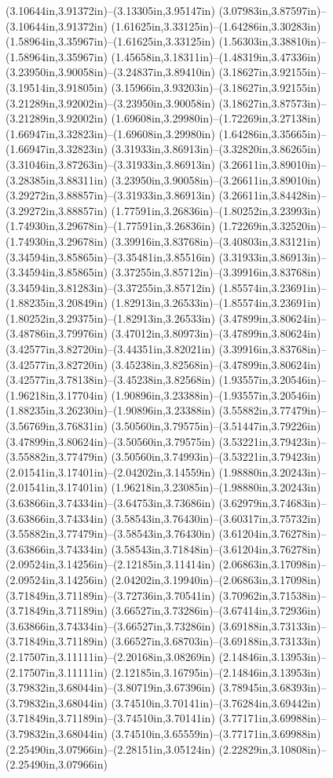 (3.10644in,3.91372in)--(3.13305in,3.95147in) (3.07983in,3.87597in)--(3.10644in,3.91372in) (1.61625in,3.33125in)--(1.64286in,3.30283in) (1.58964in,3.35967in)--(1.61625in,3.33125in) (1.56303in,3.38810in)--(1.58964in,3.35967in) (1.45658in,3.18311in)--(1.48319in,3.47336in) (3.23950in,3.90058in)--(3.24837in,3.89410in) (3.18627in,3.92155in)--(3.19514in,3.91805in) (3.15966in,3.93203in)--(3.18627in,3.92155in) (3.21289in,3.92002in)--(3.23950in,3.90058in) (3.18627in,3.87573in)--(3.21289in,3.92002in) (1.69608in,3.29980in)--(1.72269in,3.27138in) (1.66947in,3.32823in)--(1.69608in,3.29980in) (1.64286in,3.35665in)--(1.66947in,3.32823in) (3.31933in,3.86913in)--(3.32820in,3.86265in) (3.31046in,3.87263in)--(3.31933in,3.86913in) (3.26611in,3.89010in)--(3.28385in,3.88311in) (3.23950in,3.90058in)--(3.26611in,3.89010in) (3.29272in,3.88857in)--(3.31933in,3.86913in) (3.26611in,3.84428in)--(3.29272in,3.88857in) (1.77591in,3.26836in)--(1.80252in,3.23993in) (1.74930in,3.29678in)--(1.77591in,3.26836in) (1.72269in,3.32520in)--(1.74930in,3.29678in) (3.39916in,3.83768in)--(3.40803in,3.83121in) (3.34594in,3.85865in)--(3.35481in,3.85516in) (3.31933in,3.86913in)--(3.34594in,3.85865in) (3.37255in,3.85712in)--(3.39916in,3.83768in) (3.34594in,3.81283in)--(3.37255in,3.85712in) (1.85574in,3.23691in)--(1.88235in,3.20849in) (1.82913in,3.26533in)--(1.85574in,3.23691in) (1.80252in,3.29375in)--(1.82913in,3.26533in) (3.47899in,3.80624in)--(3.48786in,3.79976in) (3.47012in,3.80973in)--(3.47899in,3.80624in) (3.42577in,3.82720in)--(3.44351in,3.82021in) (3.39916in,3.83768in)--(3.42577in,3.82720in) (3.45238in,3.82568in)--(3.47899in,3.80624in) (3.42577in,3.78138in)--(3.45238in,3.82568in) (1.93557in,3.20546in)--(1.96218in,3.17704in) (1.90896in,3.23388in)--(1.93557in,3.20546in) (1.88235in,3.26230in)--(1.90896in,3.23388in) (3.55882in,3.77479in)--(3.56769in,3.76831in) (3.50560in,3.79575in)--(3.51447in,3.79226in) (3.47899in,3.80624in)--(3.50560in,3.79575in) (3.53221in,3.79423in)--(3.55882in,3.77479in) (3.50560in,3.74993in)--(3.53221in,3.79423in) (2.01541in,3.17401in)--(2.04202in,3.14559in) (1.98880in,3.20243in)--(2.01541in,3.17401in) (1.96218in,3.23085in)--(1.98880in,3.20243in) (3.63866in,3.74334in)--(3.64753in,3.73686in) (3.62979in,3.74683in)--(3.63866in,3.74334in) (3.58543in,3.76430in)--(3.60317in,3.75732in) (3.55882in,3.77479in)--(3.58543in,3.76430in) (3.61204in,3.76278in)--(3.63866in,3.74334in) (3.58543in,3.71848in)--(3.61204in,3.76278in) (2.09524in,3.14256in)--(2.12185in,3.11414in) (2.06863in,3.17098in)--(2.09524in,3.14256in) (2.04202in,3.19940in)--(2.06863in,3.17098in) (3.71849in,3.71189in)--(3.72736in,3.70541in) (3.70962in,3.71538in)--(3.71849in,3.71189in) (3.66527in,3.73286in)--(3.67414in,3.72936in) (3.63866in,3.74334in)--(3.66527in,3.73286in) (3.69188in,3.73133in)--(3.71849in,3.71189in) (3.66527in,3.68703in)--(3.69188in,3.73133in) (2.17507in,3.11111in)--(2.20168in,3.08269in) (2.14846in,3.13953in)--(2.17507in,3.11111in) (2.12185in,3.16795in)--(2.14846in,3.13953in) (3.79832in,3.68044in)--(3.80719in,3.67396in) (3.78945in,3.68393in)--(3.79832in,3.68044in) (3.74510in,3.70141in)--(3.76284in,3.69442in) (3.71849in,3.71189in)--(3.74510in,3.70141in) (3.77171in,3.69988in)--(3.79832in,3.68044in) (3.74510in,3.65559in)--(3.77171in,3.69988in) (2.25490in,3.07966in)--(2.28151in,3.05124in) (2.22829in,3.10808in)--(2.25490in,3.07966in) 